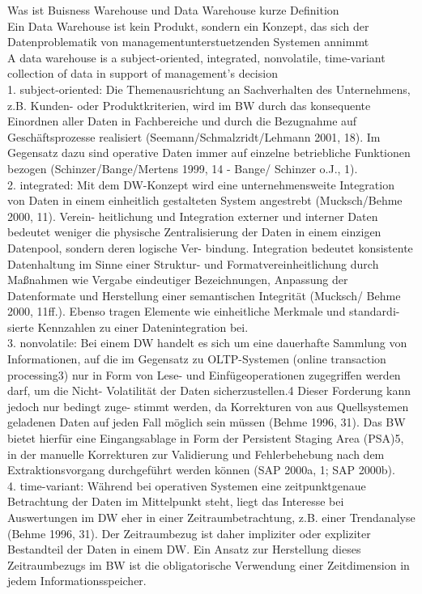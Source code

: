 Was ist Buisness Warehouse und Data Warehouse kurze Definition \\
Ein Data Warehouse ist kein Produkt, sondern ein Konzept, das sich der Datenproblematik von managementunterstuetzenden Systemen annimmt\\
A data warehouse is a subject-oriented, integrated, nonvolatile, time-variant collection of data in support of management’s decision \\

1. subject-oriented: Die Themenausrichtung an Sachverhalten des Unternehmens, z.B. Kunden- oder Produktkriterien, wird im BW durch das konsequente Einordnen aller Daten in Fachbereiche und durch die Bezugnahme auf Geschäftsprozesse realisiert (Seemann/Schmalzridt/Lehmann 2001, 18). Im Gegensatz dazu sind operative Daten immer auf einzelne betriebliche Funktionen bezogen (Schinzer/Bange/Mertens 1999, 14 - Bange/ Schinzer o.J., 1). \\
2. integrated: Mit dem DW-Konzept wird eine unternehmensweite Integration von Daten in einem einheitlich gestalteten System angestrebt (Mucksch/Behme 2000, 11). Verein- heitlichung und Integration externer und interner Daten bedeutet weniger die physische Zentralisierung der Daten in einem einzigen Datenpool, sondern deren logische Ver- bindung. Integration bedeutet konsistente Datenhaltung im Sinne einer Struktur- und Formatvereinheitlichung durch Maßnahmen wie Vergabe eindeutiger Bezeichnungen, Anpassung der Datenformate und Herstellung einer semantischen Integrität (Mucksch/ Behme 2000, 11ff.). Ebenso tragen Elemente wie einheitliche Merkmale und standardi- sierte Kennzahlen zu einer Datenintegration bei.\\
3. nonvolatile: Bei einem DW handelt es sich um eine dauerhafte Sammlung von Informationen, auf die im Gegensatz zu OLTP-Systemen (online transaction processing3) nur in Form von Lese- und Einfügeoperationen zugegriffen werden darf, um die Nicht- Volatilität der Daten sicherzustellen.4 Dieser Forderung kann jedoch nur bedingt zuge- stimmt werden, da Korrekturen von aus Quellsystemen geladenen Daten auf jeden Fall möglich sein müssen (Behme 1996, 31). Das BW bietet hierfür eine Eingangsablage in Form der Persistent Staging Area (PSA)5, in der manuelle Korrekturen zur Validierung und Fehlerbehebung nach dem Extraktionsvorgang durchgeführt werden können (SAP 2000a, 1; SAP 2000b).\\
4. time-variant: Während bei operativen Systemen eine zeitpunktgenaue Betrachtung der Daten im Mittelpunkt steht, liegt das Interesse bei Auswertungen im DW eher in einer Zeitraumbetrachtung, z.B. einer Trendanalyse (Behme 1996, 31). Der Zeitraumbezug ist daher impliziter oder expliziter Bestandteil der Daten in einem DW. Ein Ansatz zur Herstellung dieses Zeitraumbezugs im BW ist die obligatorische Verwendung einer Zeitdimension in jedem Informationsspeicher.


